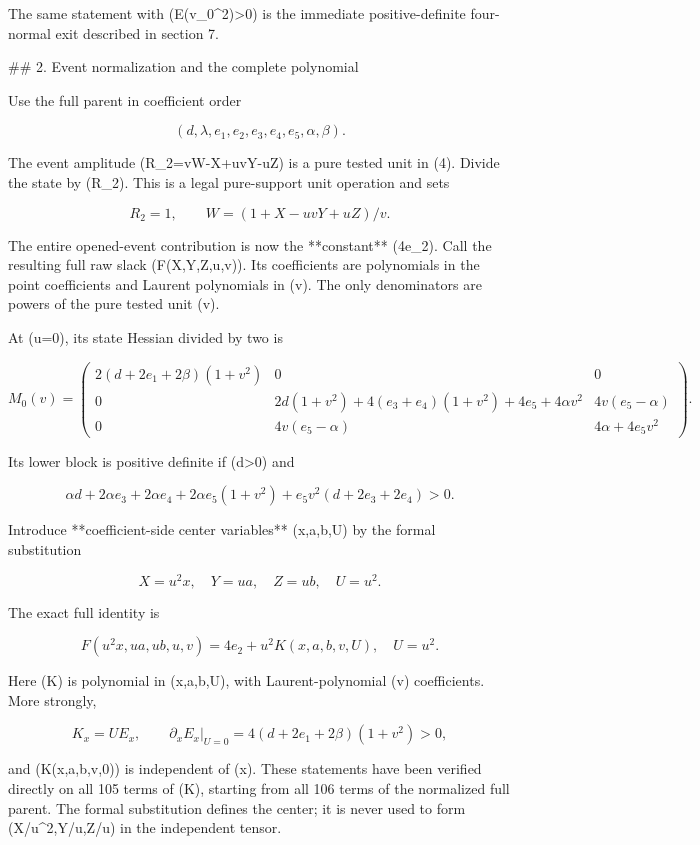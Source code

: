 The same statement with (E(v_0^2)>0) is the immediate positive-definite
four-normal exit described in section 7.

## 2. Event normalization and the complete polynomial

Use the full parent in coefficient order

\[
(d,\lambda,e_1,e_2,e_3,e_4,e_5,\alpha,\beta).
\]

The event amplitude (R_2=vW-X+uvY-uZ) is a pure tested unit in (4).
Divide the state by (R_2). This is a legal pure-support unit operation and
sets

\[
R_2=1,\qquad W=(1+X-uvY+uZ)/v.
\]

The entire opened-event contribution is now the **constant** (4e_2).
Call the resulting full raw slack (F(X,Y,Z,u,v)). Its coefficients are
polynomials in the point coefficients and Laurent polynomials in (v).
The only denominators are powers of the pure tested unit (v).

At (u=0), its state Hessian divided by two is

\[
M_0(v)=
\begin{pmatrix}
2(d+2e_1+2\beta)(1+v^2)&0&0\\
0&2d(1+v^2)+4(e_3+e_4)(1+v^2)+4e_5+4\alpha v^2
 &4v(e_5-\alpha)\\
0&4v(e_5-\alpha)&4\alpha+4e_5v^2
\end{pmatrix}.
\tag{5}
\]

Its lower block is positive definite if (d>0) and

\[
\alpha d+2\alpha e_3+2\alpha e_4+2\alpha e_5(1+v^2)
+e_5v^2(d+2e_3+2e_4)>0.
\]

Introduce **coefficient-side center variables** (x,a,b,U) by the formal
substitution

\[
X=u^2x,\quad Y=ua,\quad Z=ub,\quad U=u^2.
\]

The exact full identity is

\[
F(u^2x,ua,ub,u,v)=4e_2+u^2K(x,a,b,v,U),
\quad U=u^2.
\tag{6}
\]

Here (K) is polynomial in (x,a,b,U), with Laurent-polynomial (v)
coefficients. More strongly,

\[
K_x=U E_x,\qquad
\partial_x E_x\big|_{U=0}=4(d+2e_1+2\beta)(1+v^2)>0,
\tag{7}
\]

and (K(x,a,b,v,0)) is independent of (x). These statements have been
verified directly on all 105 terms of (K), starting from all 106 terms of
the normalized full parent. The formal substitution defines the center;
it is never used to form (X/u^2,Y/u,Z/u) in the independent tensor.

